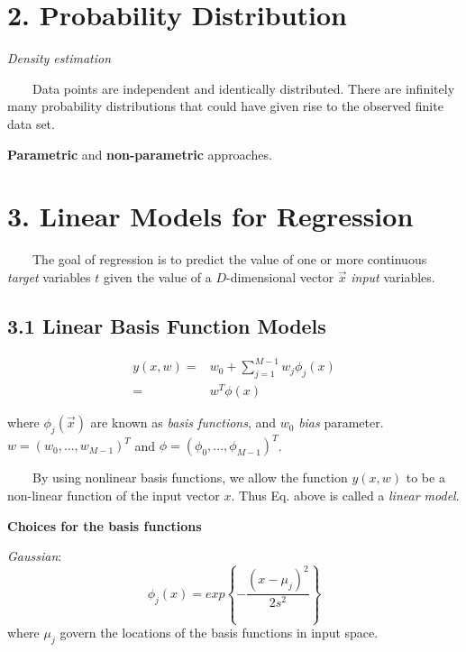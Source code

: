 \documentclass{article}
\newcommand{\tmem}[1]{{\em #1\/}}
\newcommand{\tmtextbf}[1]{{\bfseries{#1}}}
\begin{document}
\date{}

\maketitle

\section*{2. Probability Distribution}\label{header-n0}

{\tmem{Density estimation}}

$\quad \quad$Data points are independent and identically distributed. There
are infinitely many probability distributions that could have given rise to
the observed finite data set.

\tmtextbf{Parametric} and \tmtextbf{non-parametric} approaches.

\section*{3. Linear Models for Regression}\label{header-n10}

$\quad \quad$The goal of regression is to predict the value of one or more
continuous {\tmem{target}} variables $t$ given the value of a $D$-dimensional
vector $\vec{x}$ {\tmem{input}} variables.

\subsection*{3.1 Linear Basis Function Models}\label{header-n13}

\begin{align}
  y (x, w) = & w_0 + \sum^{M - 1}_{j = 1} w_j \phi_j (x)\\
  = & w^T \phi (x)
\end{align}

where $\phi_j (\vec{x})$ are known as {\tmem{basis functions}}, and $w_0$
{\tmem{bias}} parameter.\\
$w = (w_0, ..., w_{M - 1})^T$ and $\phi = (\phi_0, ..., \phi_{M - 1})^T$.

$\quad \quad$By using nonlinear basis functions, we allow the function $y (x,
w)$ to be a non-linear function of the input vector $x$. Thus Eq. above is
called a {\tmem{linear model}}.

\tmtextbf{Choices for the basis functions}

{\tmem{Gaussian}}:
\[ \phi_j (x) = exp \left\{ - \frac{(x - \mu_j)^2}{2 s^2} \right\} \]
where $\mu_j$ govern the locations of the basis functions in input space.
\end{document}
